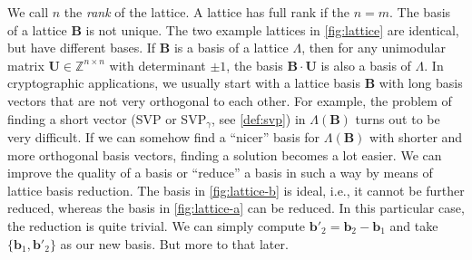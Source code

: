 We call $n$ the \textit{rank} of the lattice. A lattice has full rank if the $n=m$. The basis of a lattice $\mathbf{B}$ is not unique. The two example lattices in \cref{fig:lattice} are identical, but have different bases. If $\mathbf{B}$ is a basis of a lattice $\Lambda$, then for any unimodular matrix $\mathbf{U}\in \mathbb{Z}^{n\times n}$ with determinant $\pm 1$, the basis $\mathbf{B}\cdot \mathbf{U}$ is also a basis of $\Lambda$. In cryptographic applications, we usually start with a lattice basis $\mathbf{B}$ with long basis vectors that are not very orthogonal to each other. For example, the problem of finding a short vector (SVP or SVP$_\gamma$, see \cref{def:svp}) in $\Lambda(\mathbf{B})$ turns out to be very difficult. If we can somehow find a ``nicer'' basis for $\Lambda(\mathbf{B})$ with shorter and more orthogonal basis vectors, finding a solution becomes a lot easier. We can improve the quality of a basis or ``reduce'' a basis in such a way by means of lattice basis reduction. The basis in \cref{fig:lattice-b} is ideal, i.e., it cannot be further reduced, whereas the basis in \cref{fig:lattice-a} can be reduced. In this particular case, the reduction is quite trivial. We can simply compute $\mathbf{b}'_2 = \mathbf{b}_2 - \mathbf{b}_1$ and take $\{\mathbf{b}_1, \mathbf{b}'_2\}$ as our new basis. But more to that later.
